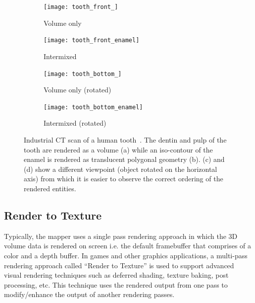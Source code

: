 \begin{figure}[ht]
\centering
  \begin{subfigure}[b]{.5\columnwidth}
    \centering
    \texttt{[image: tooth\_front\_]}
    \caption{Volume only}
    \label{fig:tooth_front}
  \end{subfigure}%
  \begin{subfigure}[b]{.5\columnwidth}
    \centering
    \texttt{[image: tooth\_front\_enamel]}
    \caption{Intermixed}
    \label{fig:tooth_front_enamel}
  \end{subfigure}
  \begin{subfigure}[b]{.5\columnwidth}
    \centering
    \texttt{[image: tooth\_bottom\_]}
    \caption{Volume only (rotated)}
    \label{fig:tooth_bottom}
  \end{subfigure}%
  \begin{subfigure}[b]{.5\columnwidth}
    \centering
    \texttt{[image: tooth\_bottom\_enamel]}
    \caption{Intermixed (rotated)}
    \label{fig:tooth_bottom_enamel}
  \end{subfigure}
  \caption{Industrial CT scan of a human tooth~\citep{pfister_transfer_2001}.
    The dentin and pulp of the tooth are rendered as a volume (a) while an
    iso-contour of the enamel is rendered as translucent polygonal geometry (b).
    (c) and (d) show a different viewpoint (object rotated on the horizontal axis)
    from which it is easier to observe the correct ordering of the rendered
    entities.}
  \label{fig:volume_peeling_tooth}
\end{figure}

\subsection{Render to Texture}
\label{rendertotexture}
Typically, the mapper uses a single pass
rendering approach in which the 3D volume data is rendered on screen i.e. the
default framebuffer that comprises of a color and a depth buffer. In games and
other graphics applications, a multi-pass rendering approach called ``Render to
Texture'' is used to support advanced visual rendering techniques such as
deferred shading, texture baking, post processing, etc. This technique uses the
rendered output from one pass to modify/enhance the output of another rendering
passes.

